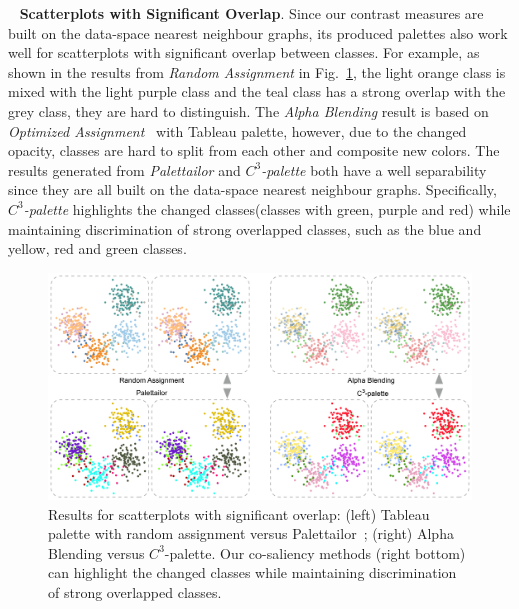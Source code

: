 \documentclass[review,onecolumn]{vgtc}                %
\newcommand{\myparagraph}[1]{\mbox{\ } \newline \noindent \textbf{#1}}
\renewcommand{\paragraph}[1]{\myparagraph{#1}}
\begin{document}
\paragraph{Scatterplots with Significant Overlap}.
Since our contrast measures are built on the data-space nearest neighbour graphs, its produced palettes also work well for scatterplots with significant overlap between classes. For example, as shown in the results from \emph{Random Assignment} in Fig.~\ref{fig:scatterOverlap}, the light orange class is mixed with the light purple class and the teal class has a strong overlap with the grey class, they are hard to distinguish. The \emph{Alpha Blending} result is based on \emph{Optimized Assignment}~\cite{Wang2018} with Tableau palette, however, due to the changed opacity, classes are hard to split from each other and composite new colors. The results generated from \emph{Palettailor} and \emph{$C^3$-palette} both have a well separability since they are all built on the data-space nearest neighbour graphs. Specifically, \emph{$C^3$-palette} highlights the changed classes(classes with green, purple and red) while maintaining discrimination of strong overlapped classes, such as the blue and yellow, red and green classes.

\begin{figure}[h]
\centering
\includegraphics[width=1\linewidth]{scatter-overlap.pdf}
\caption{Results for scatterplots with significant overlap: (left) Tableau palette with random assignment versus Palettailor~\cite{Lu21}; (right) Alpha Blending versus $C^3$-palette. Our co-saliency methods (right bottom) can highlight the changed classes while maintaining discrimination of strong overlapped classes.
}
\vspace*{-3mm}
\label{fig:scatterOverlap}
\end{figure}

\end{document}
